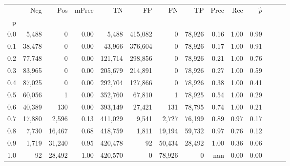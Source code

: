 \begin{tabular}{rrrrrrrrrrrrrr}
\toprule
{} &     Neg &     Pos & mPrec &       TN &       FP &      FN &      TP &  Prec &   Rec & $\hat{p}$ \\
p   &         &         &       &          &          &         &         &       &       &           \\
\midrule
0.0 &   5,488 &       0 &  0.00 &    5,488 &  415,082 &       0 &  78,926 &  0.16 &  1.00 &      0.99 \\
0.1 &  38,478 &       0 &  0.00 &   43,966 &  376,604 &       0 &  78,926 &  0.17 &  1.00 &      0.91 \\
0.2 &  77,748 &       0 &  0.00 &  121,714 &  298,856 &       0 &  78,926 &  0.21 &  1.00 &      0.76 \\
0.3 &  83,965 &       0 &  0.00 &  205,679 &  214,891 &       0 &  78,926 &  0.27 &  1.00 &      0.59 \\
0.4 &  87,025 &       0 &  0.00 &  292,704 &  127,866 &       0 &  78,926 &  0.38 &  1.00 &      0.41 \\
0.5 &  60,056 &       1 &  0.00 &  352,760 &   67,810 &       1 &  78,925 &  0.54 &  1.00 &      0.29 \\
0.6 &  40,389 &     130 &  0.00 &  393,149 &   27,421 &     131 &  78,795 &  0.74 &  1.00 &      0.21 \\
0.7 &  17,880 &   2,596 &  0.13 &  411,029 &    9,541 &   2,727 &  76,199 &  0.89 &  0.97 &      0.17 \\
0.8 &   7,730 &  16,467 &  0.68 &  418,759 &    1,811 &  19,194 &  59,732 &  0.97 &  0.76 &      0.12 \\
0.9 &   1,719 &  31,240 &  0.95 &  420,478 &       92 &  50,434 &  28,492 &  1.00 &  0.36 &      0.06 \\
1.0 &      92 &  28,492 &  1.00 &  420,570 &        0 &  78,926 &       0 &   nan &  0.00 &      0.00 \\
\bottomrule
\end{tabular}
